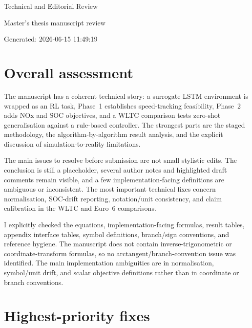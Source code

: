 \documentclass[11pt,a4paper]{article}
\begin{document}
\begin{center}
  {\Large Technical and Editorial Review}\par
  \vspace{0.3em}
  {\large Master's thesis manuscript review}\par
  \vspace{0.3em}
  {Generated: 2026-06-15 11:49:19}\par
\end{center}

\section*{Overall assessment}

The manuscript has a coherent technical story: a surrogate LSTM environment is wrapped as an RL task, Phase~1 establishes speed-tracking feasibility, Phase~2 adds NOx and SOC objectives, and a WLTC comparison tests zero-shot generalisation against a rule-based controller. The strongest parts are the staged methodology, the algorithm-by-algorithm result analysis, and the explicit discussion of simulation-to-reality limitations.

The main issues to resolve before submission are not small stylistic edits. The conclusion is still a placeholder, several author notes and highlighted draft comments remain visible, and a few implementation-facing definitions are ambiguous or inconsistent. The most important technical fixes concern normalisation, SOC-drift reporting, notation/unit consistency, and claim calibration in the WLTC and Euro~6 comparisons.

I explicitly checked the equations, implementation-facing formulas, result tables, appendix interface tables, symbol definitions, branch/sign conventions, and reference hygiene. The manuscript does not contain inverse-trigonometric or coordinate-transform formulas, so no arctangent/branch-convention issue was identified. The main implementation ambiguities are in normalisation, symbol/unit drift, and scalar objective definitions rather than in coordinate or branch conventions.

\section*{Highest-priority fixes}
\end{document}

